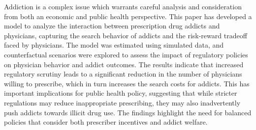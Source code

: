 \documentclass[11pt,a4paper]{article}
\begin{document}
Addiction is a complex issue which warrants careful analysis and consideration from both an economic and public health perspective. This paper has developed a model to analyze the interaction between prescription drug addicts and physicians, capturing the search behavior of addicts and the risk-reward tradeoff faced by physicians. The model was estimated using simulated data, and counterfactual scenarios were explored to assess the impact of regulatory policies on physician behavior and addict outcomes. The results indicate that increased regulatory scrutiny leads to a significant reduction in the number of physicians willing to prescribe, which in turn increases the search costs for addicts. This has important implications for public health policy, suggesting that while stricter regulations may reduce inappropriate prescribing, they may also inadvertently push addicts towards illicit drug use. The findings highlight the need for balanced policies that consider both prescriber incentives and addict welfare.

\newpage


\end{document}
